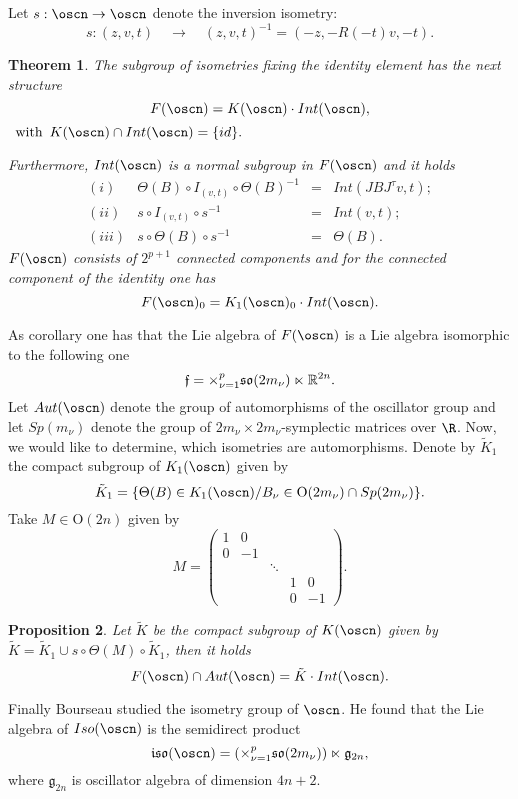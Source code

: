 \documentclass[11pt]{amsart}
\theoremstyle{plain}
\newtheorem{thm}{Theorem}[section]
\newtheorem{prop}[thm]{Proposition}
\theoremstyle{definition}
\theoremstyle{remark}
\begin{document}
Let $s:\oscn \to \oscn$ denote the inversion  isometry:
$$s: (z,v,t) \quad \to \quad (z,v,t)^{-1}=(-z, -R(-t)v,-t).$$

    \begin{thm}\cite{Bou} \label{Bou}
        The subgroup of isometries fixing the identity element has the next structure
        $$F(\oscn)=K(\oscn)\cdot 
       Int(\oscn),$$
       $ \, \mbox{ with  }\, K(\oscn)\cap Int(\oscn)=\{id\}.$
        
        Furthermore, $Int(\oscn)$ is a normal subgroup in $F(\oscn)$ and it holds
    $$ \begin{array}{crcl}
        	(i) & \Theta(B)\circ I_{(v,t)}\circ \Theta(B)^{-1} & = &Int(JBJ^{\tau}v,t);\\  	
        
        	(ii) & s\circ I_{(v,t)}\circ s^{-1} & = & Int(v,t);\\
        
        (iii) & s \circ \Theta(B) \circ s^{-1} &   = & \Theta(B).
        \end{array}$$
  $F(\oscn)$ consists of $2^{p+1}$ connected components and for the connected component of the identity one has
  $$F(\oscn)_0=K_1(\oscn)_0\cdot Int(\oscn).$$
        \end{thm}

   
As corollary one has that the Lie algebra of $F(\oscn)$ is a Lie algebra isomorphic to the following one
$$\mathfrak f ={\Large \times}_{\nu=1}^p \mathfrak{so}(2m_{\nu}) \ltimes \mathbb R^{2n}.$$
    Let $Aut(\oscn)$ denote the group of automorphisms of the oscillator group and let $Sp(m_{\nu})$ denote the group of $2m_{\nu}\times 2m_{\nu}$-symplectic matrices over $\R$. Now, we would like to determine, which isometries are automorphisms. Denote by $\tilde{K}_1$ the compact subgroup of $K_1(\oscn)$ given by 
     $$\tilde{K}_1=\{\Theta(B)\in K_1(\oscn)/B_{\nu}\in \mathrm{O}(2m_{\nu})\cap Sp(2m_{\nu})\}.$$
	Take $M\in \mathrm{O}(2n)$ given by
	$$M=\left( \begin{matrix}
	1 & 0 & & &\\
	0 & -1 & & &\\
	& & \ddots & &\\
	& & & 1 & 0\\
	& & & 0 & -1
	\end{matrix}
	\right).
	$$
	\begin{prop}
		Let $\tilde{K}$ be the compact subgroup of $K(\oscn)$ given by
	$\tilde{K}=\tilde{K}_1 \cup s\circ \Theta(M) \circ \tilde{K}_1$, then it holds
	$$F(\oscn)\cap Aut(\oscn)=\tilde{K}\cdot Int(\oscn).$$
	\end{prop}
Finally Bourseau studied the isometry group of $\oscn$. He found that
the Lie algebra of $Iso(\oscn)$ is the semidirect product
$$\mathfrak{iso}(\oscn)=(\times_{\nu=1}^p \mathfrak{so}(2m_{\nu}))\ltimes \mathfrak g_{2n},$$
where $\mathfrak{g}_{2n}$ is oscillator algebra of dimension $4n+2$. 
\end{document}
